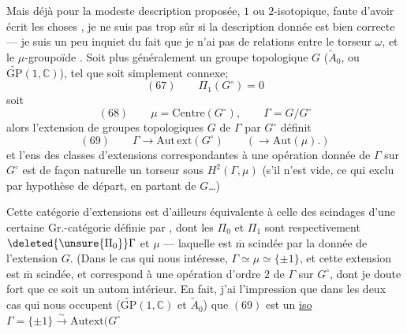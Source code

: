 Mais déjà pour la modeste description proposée,
 $1$ ou $2$-isotopique, faute d'avoir écrit les
choses , je ne suis pas trop sûr si
la description donnée est bien correcte --- je
suis un peu inquiet du fait que je n'ai
pas  de  relations entre le \inserted{$\mu$-}torseur $\omega$,
et le $\mu$-groupoïde . Soit plus généralement
un groupe topologique $G$ ($\widetilde A_0$, ou $\widetilde{\mathrm{GP}}(1,\mathbb C)$),
tel que  soit simplement connexe; 
\[
(67)\qquad\Pi_1(G^\circ)=0
\]
soit
\[
(68)\qquad \mu=\mathrm{Centre}(G^\circ),\qquad\Gamma=G/G^\circ
\]
alors l'extension de groupes topologiques $G$
de $\Gamma$ par $G^\circ$ définit
\[
(69)\qquad\Gamma\longrightarrow\mathrm{Aut\,ext}(G^\circ)
\qquad(\longrightarrow\mathrm{Aut}(\mu).)
\]
et l'ens des classes d'extensions correspondantes
à une opération  donnée de $\Gamma$ sur $G^\circ$
est de façon naturelle un torseur sous
$H^2(\Gamma,\mu)$ (s'il n'est vide, ce qui  exclu
par hypothèse de départ, en partant de $G$\ldots)

Cette catégorie d'extensions est d'ailleurs équivalente
à celle des scindages d'une certaine
Gr.-catégorie définie par , dont les $\Pi_0$ et
$\Pi_1$ sont respectivement $\deleted{\unsure{\Pi_0}}\Gamma$ et $\mu$ --- laquelle
est  $\overline{\mathrm m}$ scindée par la donnée de l'extension
$G$. (Dans le cas qui nous intéresse,
$\Gamma\simeq\mu\simeq\{\pm1\}$, et
cette extension est $\overline{\mathrm m}$ scindée, et correspond
à une opération d'ordre $2$ de $\Gamma$ sur $G^\circ$,
dont je doute fort que ce soit un autom intérieur.
En fait, j'ai l'impression que dans les
deux cas qui nous occupent ($\widetilde{\mathrm{GP}}(1,\mathbb C)$ et
$\widetilde A_0$) que $(69)$ est un \uline{iso}
$\Gamma=\{\pm1\}\xrightarrow{\sim}\mathrm{Autext}(G^\circ$

